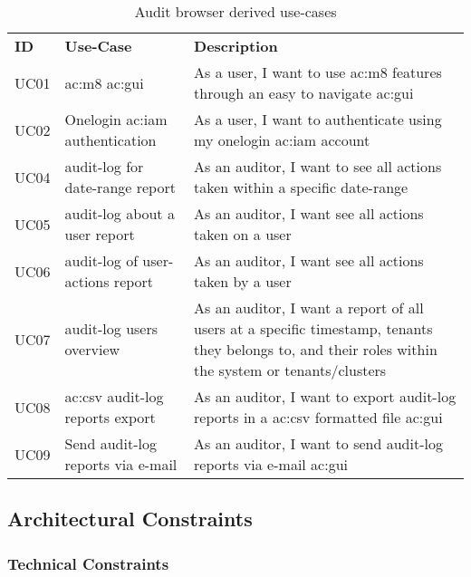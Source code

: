 \begin{table}[H]
  \begin{center}
    \caption{Audit browser derived use-cases}
    \label{tab:abuc}
    \def\arraystretch{1.5}
    \begin{tabularx}{\linewidth}{|l l X |}
      \hline
      \rowcolor{gray!20}
      \textbf{ID} & \textbf{Use-Case} & \textbf{Description}\\
      UC01 & \gls{ac:m8} \gls{ac:gui} & As a user, I want to use \gls{ac:m8} features through an easy to navigate \gls{ac:gui}\\
      UC02 & Onelogin \gls{ac:iam} authentication & As a user, I want to authenticate using my onelogin \gls{ac:iam} account\\
      UC04 & audit-log for date-range report & As an auditor, I want to see all actions taken within a specific date-range\\
      UC05 & audit-log about a user report & As an auditor, I want see all actions taken on a user\\
      UC06 & audit-log of user-actions report & As an auditor, I want see all actions taken by a user\\
      UC07 & audit-log users overview & As an auditor, I want a report of all users at a specific timestamp, tenants they belongs to, and their roles within the system or tenants/clusters\\
      UC08 & \gls{ac:csv} audit-log reports export & As an auditor, I want to export audit-log reports in a \gls{ac:csv} formatted file \gls{ac:gui}\\
      UC09 & Send audit-log reports via e-mail & As an auditor, I want to send audit-log reports via e-mail \gls{ac:gui}\\
      \hline
    \end{tabularx}
  \end{center}
\end{table}


\subsection{Architectural Constraints}

\subsubsection{Technical Constraints}

